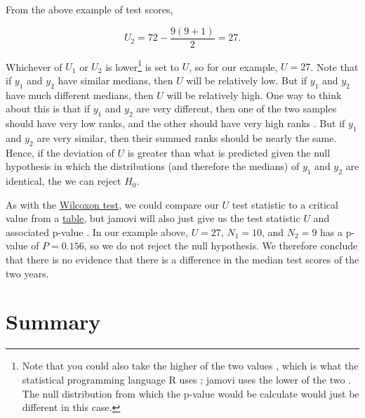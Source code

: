 \documentclass[
  openany]{scrbook}
\begin{document}
From the above example of test scores,

\[U_{2} = 72 - \frac{9\left(9 + 1 \right)}{2} = 27.\]

Whichever of \(U_{1}\) or \(U_{2}\) is lower\footnote{Note that you could also take the higher of the two values \citep{Sokal1995}, which is what the statistical programming language R uses \citep{Rproject}; jamovi uses the lower of the two \citep{Jamovi2022}. The null distribution from which the p-value would be calculate would just be different in this case.} is set to \(U\), so for our example, \(U = 27\).
Note that if \(y_{1}\) and \(y_{2}\) have similar medians, then \(U\) will be relatively low.
But if \(y_{1}\) and \(y_{2}\) have much different medians, then \(U\) will be relatively high.
One way to think about this is that if \(y_{1}\) and \(y_{2}\) are very different, then one of the two samples should have very low ranks, and the other should have very high ranks \citep{Sokal1995}.
But if \(y_{1}\) and \(y_{2}\) are very similar, then their summed ranks should be nearly the same.
Hence, if the deviation of \(U\) is greater than what is predicted given the null hypothesis in which the distributions (and therefore the medians) of \(y_{1}\) and \(y_{2}\) are identical, the we can reject \(H_{0}\).

As with the \protect\hyperlink{wilcoxon-test}{Wilcoxon test}, we could compare our \(U\) test statistic to a critical value from a \protect\hyperlink{mann-whitney-u-critical-values}{table}, but jamovi will also just give us the test statistic \(U\) and associated p-value \citep{Jamovi2022}.
In our example above, \(U = 27\), \(N_{1} = 10\), and \(N_{2} = 9\) has a p-value of \(P = 0.156\), so we do not reject the null hypothesis.
We therefore conclude that there is no evidence that there is a difference in the median test scores of the two years.

\hypertarget{summary-3}{%
\section{Summary}\label{summary-3}}
\end{document}
